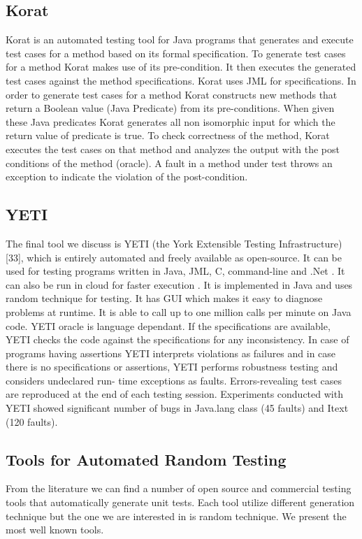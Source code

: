 \subsection{Korat}
Korat \cite{Boyapati2002} is an automated testing tool for Java programs that generates and execute test cases for a method based on its formal specification. To generate test cases for a method Korat makes use of its pre-condition. It then executes the generated test cases against the method specifications. Korat uses JML for specifications. In order to generate test cases for a method Korat constructs new methods that return a Boolean value (Java Predicate) from its pre-conditions. When given these Java predicates Korat generates all non isomorphic input for which the return value of predicate is true. To check correctness of the method, Korat executes the test cases on that method and analyzes the output with the post conditions of the method (oracle). A fault in a method under test throws an exception to indicate the violation of the post-condition.

\subsection{YETI}
The final tool we discuss is YETI (the York Extensible Testing Infrastructure) [33], which is entirely automated and freely available as open-source. It can be used for testing programs written in Java, JML, C, command-line and .Net \cite{Oriol2010c}. It can also be run in cloud for faster execution \cite{Oriol2010}. It is implemented in Java and uses random technique for testing. It has GUI which makes it easy to diagnose problems at runtime. It is able to call up to one million calls per minute on Java code. YETI oracle is language dependant. If the specifications are available, YETI checks the code against the specifications for any inconsistency. In case of programs having assertions YETI interprets violations as failures and in case there is no specifications or assertions, YETI performs robustness testing and considers undeclared run- time exceptions as faults. Errors-revealing test cases are reproduced at the end of each testing session. Experiments conducted with YETI showed significant number of bugs in Java.lang class (45 faults) and Itext (120 faults).

\subsection{Tools for Automated Random Testing}
From the literature we can find a number of open source and commercial testing tools that automatically generate unit tests. Each tool utilize different generation technique but the one we are interested in is random technique. We present the most well known tools.

